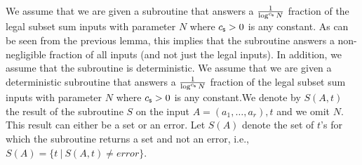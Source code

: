 \documentclass[11pt]{article}
\newcommand\C[1]{{ c_{\sf {#1}} }}
\begin{document}
{We assume that we are given a subroutine that answers a $\frac{1}{\log ^ {\C{s}} N}$ fraction of the legal subset sum
inputs with parameter $N$ where $\C{s}>0$ is any constant. As can be seen from the previous lemma, this implies that
the subroutine answers a non-negligible fraction of all inputs (and not just the legal inputs). In addition, we
assume that the subroutine is deterministic. %
}{We assume that we are given a deterministic subroutine that answers a $\frac{1}{\log ^ {\C{s}} N}$ fraction of the
legal subset sum inputs with parameter $N$ where $\C{s}>0$ is any constant.}We denote by $S(A,t)$ the result of the
subroutine $S$ on the input $A=(a_1,\ldots,a_r),t$ and we omit $N$. This result can either be a set or an error. Let
$S(A)$ denote the set of $t$'s for which the subroutine returns a set and not an error, i.e., $S(A)=\{t~|~S(A,t) \neq
error\}$.
\end{document}
